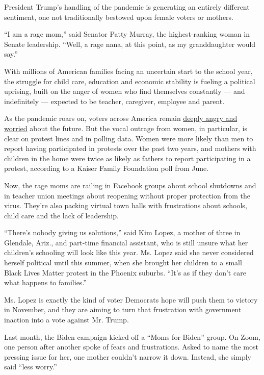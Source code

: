 President Trump's handling of the pandemic is generating an entirely
different sentiment, one not traditionally bestowed upon female voters
or mothers.

``I am a rage mom,'' said Senator Patty Murray, the highest-ranking
woman in Senate leadership. ``Well, a rage nana, at this point, as my
granddaughter would say.''

With millions of American families facing an uncertain start to the
school year, the struggle for child care, education and economic
stability is fueling a political uprising, built on the anger of women
who find themselves constantly --- and indefinitely --- expected to be
teacher, caregiver, employee and parent.

As the pandemic roars on, voters across America remain
\href{https://www.nytimes3xbfgragh.onion/2020/06/12/us/politics/election-coronavirus-protests-unemployment.html}{deeply
angry and worried} about the future. But the vocal outrage from women,
in particular, is clear on protest lines and in polling data. Women were
more likely than men to report having participated in protests over the
past two years, and mothers with children in the home were twice as
likely as fathers to report participating in a protest, according to a
Kaiser Family Foundation poll from June.

Now, the rage moms are railing in Facebook groups about school shutdowns
and in teacher union meetings about reopening without proper protection
from the virus. They're also packing virtual town halls with
frustrations about schools, child care and the lack of leadership.

``There's nobody giving us solutions,'' said Kim Lopez, a mother of
three in Glendale, Ariz., and part-time financial assistant, who is
still unsure what her children's schooling will look like this year. Ms.
Lopez said she never considered herself political until this summer,
when she brought her children to a small Black Lives Matter protest in
the Phoenix suburbs. ``It's as if they don't care what happens to
families.''

Ms. Lopez is exactly the kind of voter Democrats hope will push them to
victory in November, and they are aiming to turn that frustration with
government inaction into a vote against Mr. Trump.

Last month, the Biden campaign kicked off a ``Moms for Biden'' group. On
Zoom, one person after another spoke of fears and frustrations. Asked to
name the most pressing issue for her, one mother couldn't narrow it
down. Instead, she simply said ``less worry.''

